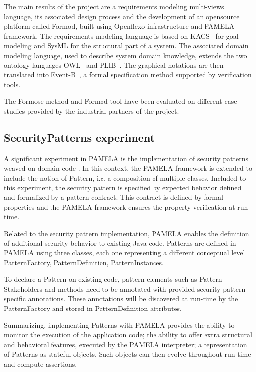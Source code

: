 The main results of the project are a requirements modeling multi-views
language, its associated design process and the development of an opensource
platform called Formod\cite{FormodWebSite}, built using Openflexo
infrastructure and PAMELA framework. 
The requirements modeling language is based on KAOS~\cite{kaos} for goal
modeling and SysML for the structural part of a system. The associated domain
modeling language, used to describe system domain knowledge, extends the two
ontology languages OWL~\cite{owl} and PLIB~\cite{plib}. The graphical notations
are then translated into Event-B~\cite{eventb}, a formal specification method supported by verification tools. 


The Formose method and Formod tool have been evaluated on different case studies provided by the industrial partners of the project.



\subsection{SecurityPatterns experiment}

A significant experiment in PAMELA is the implementation of security patterns weaved on domain code \cite{silva20}.
In this context, the PAMELA framework is extended to include the notion of Pattern, i.e. a composition of multiple classes. Included to this experiment, the security pattern is specified by expected behavior defined and formalized by a pattern contract. This contract is defined by formal properties and the PAMELA framework ensures the property verification at run-time.

Related to the security pattern implementation, PAMELA enables the definition of additional security behavior to existing Java code.
Patterns are defined in PAMELA using three classes, each one representing a different conceptual level PatternFactory, PatternDefinition, PatternInstances.

To declare a Pattern on existing code, pattern elements such as Pattern Stakeholders and methods need to be annotated with provided security pattern-specific annotations. These annotations will be discovered at run-time by the PatternFactory and stored in PatternDefinition attributes.


Summarizing, implementing Patterns with PAMELA provides the ability to monitor the execution of the application code; the ability to offer extra structural and behavioral features, executed by the PAMELA interpreter; a representation of Patterns as stateful objects. Such objects can then evolve throughout run-time and compute assertions.








